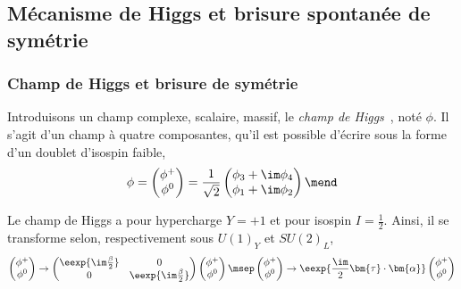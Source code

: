 \subsection{Mécanisme de Higgs et brisure spontanée de symétrie}\label{chapter-MS-MSSM-section-formalisme-subsec-Higgs_mechanism}
\subsubsection{Champ de Higgs et brisure de symétrie}\label{chapter-MS-MSSM-section-formalisme-subsec-Higgs_mechanism-subsubsec-potentiel}
Introduisons un champ complexe, scalaire, massif, le \emph{champ de Higgs}~\cite{Englert_Brout,Higgs_1,Higgs_2,Guralnik_Hagen_Kibble}, noté $\phi$. Il s'agit d'un champ à quatre composantes, qu'il est possible d'écrire sous la forme d'un doublet d'isospin faible,
\begin{equation}
\phi
=
\begin{pmatrix}
\phi^+ \\ \phi^0
\end{pmatrix}
=
\frac{1}{\sqrt{2}}
\begin{pmatrix}
\phi_3 + \im \phi_4 \\ \phi_1 + \im \phi_2
\end{pmatrix}
\mend
\label{eq-chapter-MS-MSSM-section-formalisme-subsec-Higgs_mechanism-SM_Higgs_doublet}
\end{equation}
\par Le champ de Higgs a pour hypercharge $Y=+1$ et pour isospin $I=\frac{1}{2}$. Ainsi, il se transforme selon, respectivement sous $U(1)_Y$ et $SU(2)_L$,
\begin{equation}
\begin{pmatrix}
\phi^+ \\ \phi^0
\end{pmatrix}
\to
\begin{pmatrix}
\eexp{\im\frac{\beta}{2}} & 0 \\ 0 & \eexp{\im\frac{\beta}{2}}
\end{pmatrix}
\begin{pmatrix}
\phi^+ \\ \phi^0
\end{pmatrix}
\msep
\begin{pmatrix}
\phi^+ \\ \phi^0
\end{pmatrix}
\to
\eexp{\frac{\im}{2}\bm{\tau}\cdot\bm{\alpha}}
\begin{pmatrix}
\phi^+ \\ \phi^0
\end{pmatrix}
\end{equation}
